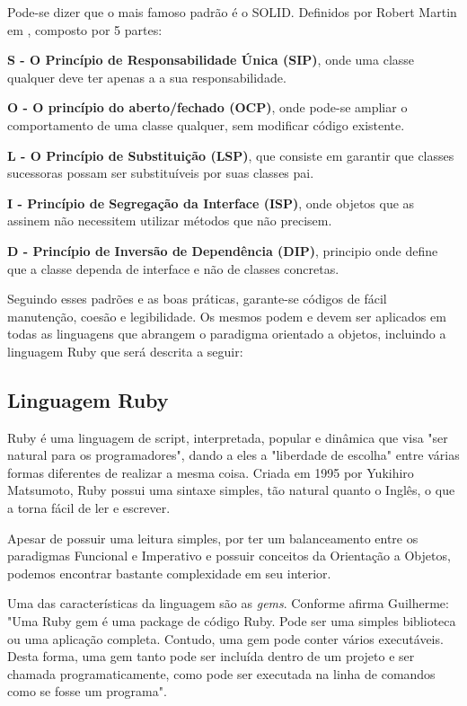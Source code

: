 \documentclass[11pt,a4paper,usenames,dvipsnames]{article}
\begin{document}
Pode-se dizer que o mais famoso padrão é o SOLID. Definidos por Robert Martin em \cite{martin2006agile}, composto por 5 partes:

\textbf{S - O Princípio de Responsabilidade Única (SIP)}, onde uma classe qualquer deve ter apenas a a sua responsabilidade. 

\textbf{O - O princípio do aberto/fechado (OCP)}, onde pode-se ampliar o comportamento de uma classe qualquer, sem modificar código existente. 

\textbf{L - O Princípio de Substituição (LSP)}, que consiste em garantir que classes sucessoras possam ser substituíveis por suas classes pai. 

\textbf{I - Princípio de Segregação da Interface (ISP)}, onde objetos que as assinem não necessitem utilizar métodos que não precisem. 

\textbf{D - Princípio de Inversão de Dependência (DIP)}, principio onde define que a classe dependa de interface e não de classes concretas.

Seguindo esses padrões e as boas práticas, garante-se códigos de fácil manutenção, coesão e legibilidade. Os mesmos podem e devem ser aplicados em todas as linguagens que abrangem o paradigma orientado a objetos, incluindo a linguagem Ruby que será descrita a seguir:

\subsection{Linguagem Ruby}
Ruby é uma linguagem de script, interpretada, popular e dinâmica que visa "ser
natural para os programadores", dando a eles a "liberdade de escolha" entre várias formas diferentes de realizar a mesma coisa\cite{RubyLanguage}. 
Criada em 1995 por Yukihiro Matsumoto, Ruby possui uma sintaxe simples, tão natural quanto o Inglês, o que a torna fácil de ler e escrever. 

Apesar de possuir uma leitura simples, por ter um balanceamento entre os paradigmas Funcional e Imperativo e possuir conceitos da Orientação a Objetos, podemos encontrar bastante complexidade em seu interior\cite{RB}.

Uma das características da linguagem são as \textit{gems}. Conforme afirma Guilherme: "Uma Ruby gem é uma package de código Ruby. Pode ser uma simples biblioteca ou uma
aplicação completa. Contudo, uma gem pode conter vários executáveis. Desta forma, uma
gem tanto pode ser incluída dentro de um projeto e ser chamada programaticamente,
como pode ser executada na linha de comandos como se fosse um programa"\cite{RC}.
\end{document}
